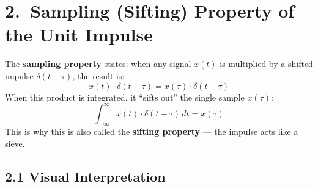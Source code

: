 \documentclass[10pt,a4paper]{article}
\newcommand{\Int}{\displaystyle\int_{-\infty}^{\infty}}
\begin{document}
\section{2.\ Sampling (Sifting) Property of the Unit Impulse}

\begin{defbox}
The \textbf{sampling property} states: when any signal $x(t)$ is multiplied by a shifted impulse $\delta(t-\tau)$, the result is:
\[
  x(t)\cdot\delta(t-\tau) = x(\tau)\cdot\delta(t-\tau)
\]
When this product is integrated, it ``sifts out'' the single sample $x(\tau)$:
\[
  \Int x(t)\cdot\delta(t-\tau)\,dt = x(\tau)
\]
This is why this is also called the \textbf{sifting property} --- the impulse acts like a sieve.
\end{defbox}

\subsection*{2.1 Visual Interpretation}
\end{document}
